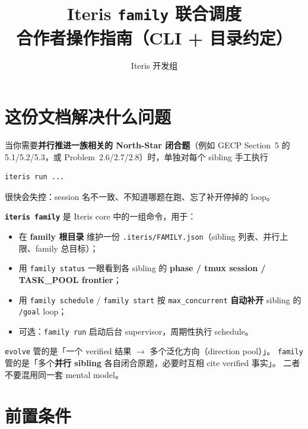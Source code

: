 \documentclass[11pt,a4paper]{ctexart}
\title{\textbf{Iteris \texttt{family} 联合调度}\\[0.4em]
  \large 合作者操作指南（CLI + 目录约定）}
\author{Iteris 开发组 \quad {\small 2026-06-20}}
\date{}
\begin{document}
\maketitle
\tableofcontents
\newpage

\section{这份文档解决什么问题}

当你需要\textbf{并行推进一族相关的 North-Star 闭合题}（例如 GECP Section~5 的 5.1/5.2/5.3，或 Problem~2.6/2.7/2.8）时，单独对每个 sibling 手工执行
\begin{lstlisting}[style=shell]
iteris run ...
\end{lstlisting}
很快会失控：session 名不一致、不知道哪题在跑、忘了补开停掉的 loop。

\textbf{\texttt{iteris family}} 是 Iteris core 中的一组命令，用于：
\begin{itemize}[nosep]
  \item 在 \textbf{family 根目录} 维护一份 \texttt{.iteris/FAMILY.json}（sibling 列表、并行上限、family 总目标）；
  \item 用 \texttt{family status} 一眼看到各 sibling 的 \textbf{phase / tmux session / TASK\_POOL frontier}；
  \item 用 \texttt{family schedule} / \texttt{family start} 按 \texttt{max\_concurrent} \textbf{自动补开} sibling 的 \texttt{/goal} loop；
  \item 可选：\texttt{family run} 启动后台 supervisor，周期性执行 schedule。
\end{itemize}

\begin{remark}
\texttt{evolve} 管的是「一个 verified 结果 $\to$ 多个泛化方向（direction pool）」。
\texttt{family} 管的是「多个\textbf{并行 sibling} 各自闭合原题，必要时互相 cite verified 事实」。
二者不要混用同一套 mental model。
\end{remark}

\section{前置条件}
\end{document}
